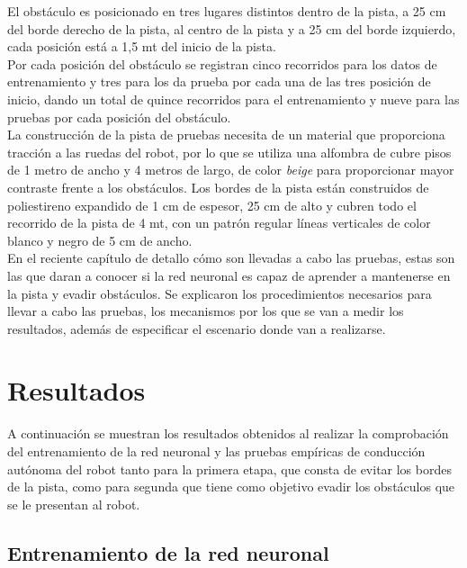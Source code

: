 \documentclass{iccmemoria}
\begin{document}
El obstáculo es posicionado en tres lugares distintos dentro de la pista, a 25 cm del borde derecho de la pista, al centro de la pista y a 25 cm del borde izquierdo, cada posición está a 1,5 mt del inicio de la pista.\\

Por cada posición del obstáculo se registran cinco recorridos para los datos de entrenamiento y tres para los da prueba por cada una de las tres posición de inicio, dando un total de quince recorridos para el entrenamiento y nueve para las pruebas por cada posición del obstáculo.\\
 
La construcción de la pista de pruebas necesita de un material que proporciona tracción a las ruedas del robot, por lo que se utiliza una alfombra de cubre pisos de 1 metro de ancho y 4 metros de largo, de color \emph{beige} para proporcionar mayor contraste frente a los obstáculos. Los bordes de la pista están construidos de poliestireno expandido de 1 cm de espesor, 25 cm de alto y cubren todo el recorrido de la pista de 4 mt, con un patrón regular líneas verticales de color blanco y negro de 5 cm de ancho.\\

En el reciente capítulo de detallo cómo son llevadas a cabo las pruebas, estas son las que daran a conocer si la red neuronal es capaz de aprender a mantenerse en la pista y evadir obstáculos. Se explicaron los procedimientos necesarios para llevar a cabo las pruebas, los mecanismos por los que se van a medir los resultados, además de especificar el escenario donde van a realizarse.\\

\chapter{Resultados}

A continuación se muestran los resultados obtenidos al realizar la comprobación del entrenamiento de la red neuronal y las pruebas empíricas de conducción autónoma del robot tanto para la primera etapa, que consta de evitar los bordes de la pista, como para segunda que tiene como objetivo evadir los obstáculos que se le presentan al robot.\\

\section{Entrenamiento de la red neuronal}
\end{document}
